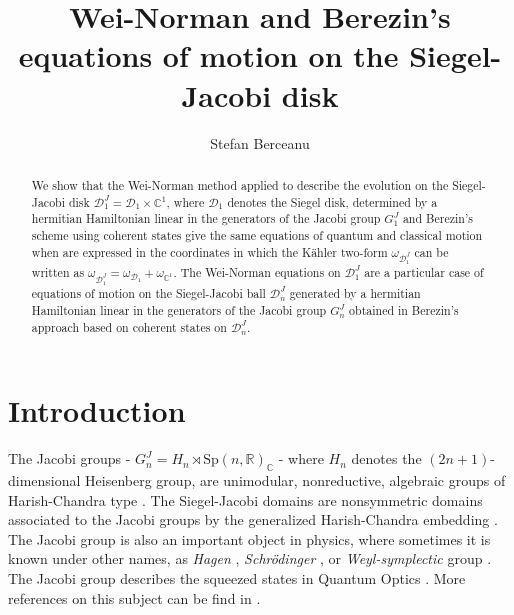 \documentclass[12pt]{amsart}
\numberwithin{equation}{section}
\theoremstyle{definition}
\begin{document}
\title{Wei-Norman and Berezin's equations of motion on the Siegel-Jacobi disk} 
\author{Stefan  Berceanu}
\address[Stefan  Berceanu]{National
 Institute for Physics and Nuclear Engineering\\
         Department of Theoretical Physics\\
         PO BOX MG-6, Bucharest-Magurele, Romania}

\begin{abstract}
We show that the Wei-Norman method applied to describe the evolution  on the
Siegel-Jacobi disk  $\mathcal{D}^J_1=\mathcal{D}_1\times\mathbb{C}^1$, 
where $\mathcal{D}_1$  denotes the Siegel disk,  determined by a hermitian 
Hamiltonian   linear in the generators of the Jacobi group $G^J_1$  and Berezin's
scheme using coherent states give the same equations of  quantum and
classical motion when are expressed in  the coordinates in which the K\"ahler  
two-form $\omega_{\mathcal{D}^J_1} $ can be written as
$\omega_{\mathcal{D}^J_1}=\omega_{\mathcal{D}_1}+\omega_{\mathbb{C}^1}$. 
The Wei-Norman equations on $\mathcal{D}^J_1$  are a particular case
of equations  of motion on the Siegel-Jacobi ball $\mathcal{D}^J_n$
generated by a hermitian Hamiltonian  linear in the generators of the
Jacobi group $G^J_n$ obtained in Berezin's approach based on  coherent 
states on $\mathcal{D}^J_n$.
\end{abstract}

\maketitle
\noindent
\tableofcontents
\newpage
\section{Introduction}\label{intro}

The Jacobi groups -
$G^J_n=H_n\rtimes\text{Sp}(n,{\ensuremath{\mathbb{R}}})_{\ensuremath{\mathbb{C}}}$ -  where  $H_n$ denotes the 
$(2n+1)$-dimensional Heisenberg group, are unimodular,
nonreductive,  algebraic groups  \cite{ez,bs,TA99, LEE03,gem}  of Harish-Chandra type \cite{satake}. 
The Siegel-Jacobi
domains are nonsymmetric domains associated to the Jacobi groups
by the generalized Harish-Chandra embedding \cite{satake,LEE03, Y02,Y10,gem}.  The Jacobi group  is also an important object in
physics, where  sometimes it is    known  under 
 other names, as 
 {\it Hagen} \cite{hagen},  {\it Schr\"odinger} \cite{ni},    or {\it Weyl-symplectic} group
 \cite{kbw1}. The Jacobi
group describes the   squeezed states  \cite{stol,lu,ho} in Quantum Optics
\cite{mandel,ali,dr}. More references on this subject can be find in \cite{jac1,sbj,sbcg,nou,FC}.
\end{document}

